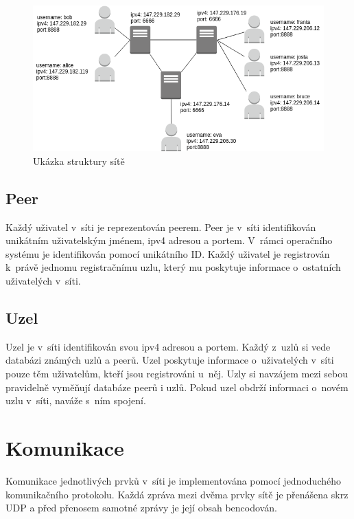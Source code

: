 \documentclass[11pt,a4paper,titlepage]{article}
\begin{document}
        \begin{figure}[htbp]
            \begin{center}
                \includegraphics[scale=0.5]{base.png}
                \caption{Ukázka struktury sítě}
                \label{base}
            \end{center}
        \end{figure}

		\subsection{Peer}
            Každý uživatel v~síti je reprezentován peerem. Peer je v~síti identifikován unikátním uživatelským
            jménem, ipv4 adresou a portem. V~rámci operačního systému je identifikován pomocí unikátního ID.
            Každý uživatel je registrován k~právě jednomu registračnímu uzlu, který
            mu poskytuje informace o~ostatních uživatelých v~síti.

        \subsection{Uzel}
            Uzel je v~síti identifikován svou ipv4 adresou a portem. Každý z~uzlů si vede databázi známých uzlů a peerů. Uzel poskytuje informace
o~uživatelých v~síti pouze těm uživatelům, kteří jsou registrováni u~něj. Uzly si
            navzájem mezi sebou pravidelně vyměňují databáze peerů i uzlů. Pokud uzel obdrží informaci
            o~novém uzlu v~síti, naváže s~ním spojení.

    \section{Komunikace}
        Komunikace jednotlivých prvků v~síti je implementována pomocí jednoduchého komunikačního protokolu. Každá zpráva
        mezi dvěma prvky sítě je přenášena skrz UDP a před přenosem samotné zprávy je její obsah
        bencodován.
\end{document}
